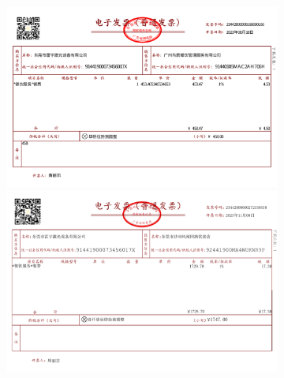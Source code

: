 \documentclass[a4paper]{article}
\begin{document}
	\begin{figure}
		\centering %
		\begin{subfigure}{0.95\linewidth}
			\includegraphics[width=\linewidth]{software/5}
			\includegraphics[width=\linewidth]{software/6}
		\end{subfigure}
	\end{figure} 
	
\end{document}

